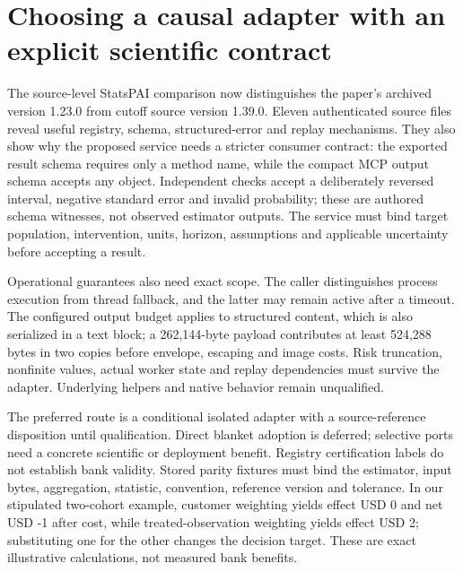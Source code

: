 \hypertarget{choosing-a-causal-adapter-with-an-explicit-scientific-contract}{%
\section{Choosing a causal adapter with an explicit scientific
contract}\label{choosing-a-causal-adapter-with-an-explicit-scientific-contract}}

The source-level StatsPAI comparison now distinguishes the paper's
archived version 1.23.0 from cutoff source version 1.39.0. Eleven
authenticated source files reveal useful registry, schema,
structured-error and replay mechanisms. They also show why the proposed
service needs a stricter consumer contract: the exported result schema
requires only a method name, while the compact MCP output schema accepts
any object. Independent checks accept a deliberately reversed interval,
negative standard error and invalid probability; these are authored
schema witnesses, not observed estimator outputs. The service must bind
target population, intervention, units, horizon, assumptions and
applicable uncertainty before accepting a result.
\citep{exec23_statspai_contract,exec23_statspai_contract_reference}

Operational guarantees also need exact scope. The caller distinguishes
process execution from thread fallback, and the latter may remain active
after a timeout. The configured output budget applies to structured
content, which is also serialized in a text block; a 262,144-byte
payload contributes at least 524,288 bytes in two copies before
envelope, escaping and image costs. Risk truncation, nonfinite values,
actual worker state and replay dependencies must survive the adapter.
Underlying helpers and native behavior remain unqualified.
\citep{exec23_statspai_contract,exec23_statspai_contract_reference}

The preferred route is a conditional isolated adapter with a
source-reference disposition until qualification. Direct blanket
adoption is deferred; selective ports need a concrete scientific or
deployment benefit. Registry certification labels do not establish bank
validity. Stored parity fixtures must bind the estimator, input bytes,
aggregation, statistic, convention, reference version and tolerance. In
our stipulated two-cohort example, customer weighting yields effect USD
0 and net USD -1 after cost, while treated-observation weighting yields
effect USD 2; substituting one for the other changes the decision
target. These are exact illustrative calculations, not measured bank
benefits.
\citep{exec23_statspai_contract,exec23_statspai_contract_reference}

